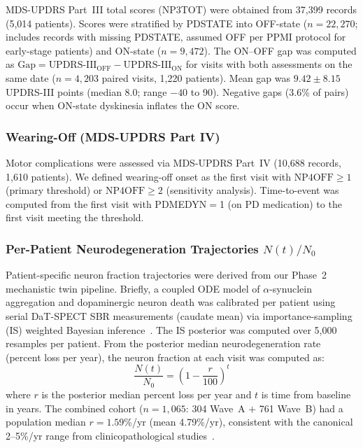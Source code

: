 MDS-UPDRS Part~III total scores (NP3TOT) were obtained from 37,399
records (5,014 patients). Scores were stratified by PDSTATE into OFF-state
($n{=}22{,}270$; includes records with missing PDSTATE, assumed OFF per
PPMI protocol for early-stage patients) and ON-state ($n{=}9{,}472$).
The ON--OFF gap was computed as $\text{Gap} = \text{UPDRS-III}_\text{OFF}
- \text{UPDRS-III}_\text{ON}$ for visits with both assessments on the same
date ($n{=}4{,}203$ paired visits, 1,220 patients). Mean gap was
$9.42 \pm 8.15$ UPDRS-III points (median 8.0; range $-40$ to 90).
Negative gaps (3.6\% of pairs) occur when ON-state dyskinesia inflates
the ON score.

\subsubsection{Wearing-Off (MDS-UPDRS Part IV)}

Motor complications were assessed via MDS-UPDRS Part~IV (10,688 records,
1,610 patients). We defined wearing-off onset as the first visit with
$\text{NP4OFF} \geq 1$ (primary threshold) or $\text{NP4OFF} \geq 2$
(sensitivity analysis). Time-to-event was computed from the first visit
with PDMEDYN$=$1 (on PD medication) to the first visit meeting the
threshold.

\subsubsection{Per-Patient Neurodegeneration Trajectories $N(t)/N_0$}

Patient-specific neuron fraction trajectories were derived from our
Phase~2 mechanistic twin pipeline. Briefly, a coupled ODE model of
$\alpha$-synuclein aggregation and dopaminergic neuron death was
calibrated per patient using serial DaT-SPECT SBR measurements (caudate
mean) via importance-sampling (IS) weighted Bayesian
inference~\cite{fearnley1991}. The IS posterior was computed over 5,000
resamples per patient. From the posterior median neurodegeneration rate
(percent loss per year), the neuron fraction at each visit was computed as:
\begin{equation}
  \frac{N(t)}{N_0} = \left(1 - \frac{r}{100}\right)^t
  \label{eq:nfrac}
\end{equation}
where $r$ is the posterior median percent loss per year and $t$ is time
from baseline in years. The combined cohort ($n{=}1{,}065$: 304 Wave~A
$+$ 761 Wave~B) had a population median $r{=}1.59$\%/yr (mean
4.79\%/yr), consistent with the canonical 2--5\%/yr range from
clinicopathological studies~\cite{fearnley1991}.

